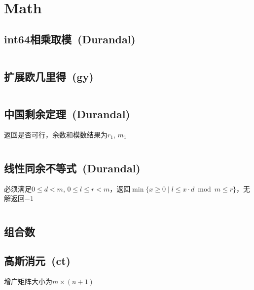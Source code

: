 \chapter{Math}
\section{int64相乘取模\ \small(Durandal)}
	\inputminted{cpp}{Math/int64_multiply_mod.cpp}
\section{扩展欧几里得\ \small(gy)}
	\inputminted{cpp}{Math/extend_gcd.cpp}
\section{中国剩余定理\ \small(Durandal)}
	返回是否可行，余数和模数结果为$ r_1 $, $ m_1 $
	\inputminted{cpp}{Math/chinese_remainder_theorem.cpp}
\section{线性同余不等式\ \small(Durandal)}
	必须满足$ 0 \leq d < m $, $ 0 \leq l \leq r < m $，返回$ \min\lbrace x \geq 0 \mid l \leq x \cdot d \bmod m \leq r \rbrace $，无解返回$ -1 $ 
	\inputminted{cpp}{Math/linear_congruence_inequality.cpp}
\section{组合数}
\section{高斯消元\ \small(ct)}
	增广矩阵大小为$ m \times (n + 1) $
	\inputminted{cpp}{Math/gauss_elimination.cpp}
